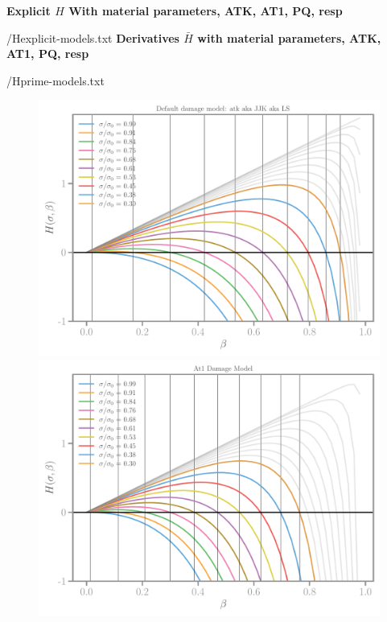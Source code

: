 \documentclass[]{article}
\begin{document}
\textbf{Explicit $H$ With material parameters, ATK, AT1, PQ, resp}

{/Hexplicit-models.txt}
\textbf{Derivatives $\bar H$ with material parameters, ATK, AT1, PQ, resp}

{/Hprime-models.txt}


\begin{figure}[htbp]
  \centering
  \includegraphics[width=.312\textheight, angle=90]{../figures/atk-Hbeta.pdf}
  \includegraphics[width=.312\textheight, angle=90]{../figures/at1-Hbeta.pdf}

\end{figure}
\end{document}
